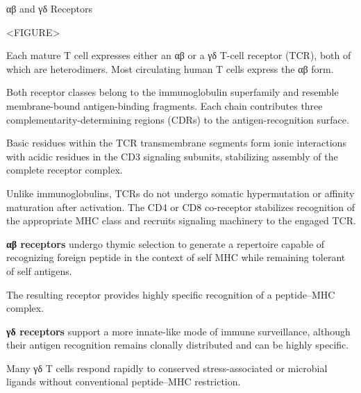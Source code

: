       \begin{core}{αβ and γδ Receptors}

        <FIGURE>

        Each mature T cell expresses either an αβ or a γδ T-cell receptor (TCR), both of which are heterodimers. Most circulating human T cells express the αβ form.

        Both receptor classes belong to the immunoglobulin superfamily and resemble membrane-bound antigen-binding fragments. Each chain contributes three complementarity-determining regions (CDRs) to the antigen-recognition surface.

        Basic residues within the TCR transmembrane segments form ionic interactions with acidic residues in the CD3 signaling subunits, stabilizing assembly of the complete receptor complex.

        Unlike immunoglobulins, TCRs do not undergo somatic hypermutation or affinity maturation after activation. The CD4 or CD8 co-receptor stabilizes recognition of the appropriate MHC class and recruits signaling machinery to the engaged TCR.

        \textbf{αβ receptors} undergo thymic selection to generate a repertoire capable of recognizing foreign peptide in the context of self MHC while remaining tolerant of self antigens.

        The resulting receptor provides highly specific recognition of a peptide--MHC complex.

        \textbf{γδ receptors} support a more innate-like mode of immune surveillance, although their antigen recognition remains clonally distributed and can be highly specific.

        Many γδ T cells respond rapidly to conserved stress-associated or microbial ligands without conventional peptide--MHC restriction.


\end{core}
